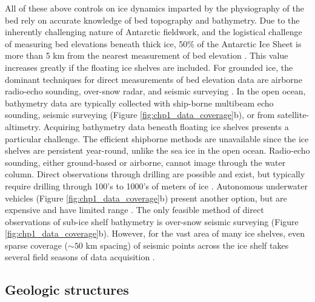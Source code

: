 All of these above controls on ice dynamics imparted by the physiography of the bed rely on accurate knowledge of bed topography and bathymetry. Due to the inherently challenging nature of Antarctic fieldwork, and the logistical challenge of measuring bed elevations beneath thick ice, 50\% of the Antarctic Ice Sheet is more than 5 km from the nearest measurement of bed elevation \citep[Figure \ref{fig:chp1_data_coverage}a,][]{morlighemdeep2020}. This value increases greatly if the floating ice shelves are included. For grounded ice, the dominant techniques for direct measurements of bed elevation data are airborne radio-echo sounding, over-snow radar, and seismic surveying \citep[Figure \ref{fig:chp1_data_coverage}b,][]{fretwellbedmap22013}. In the open ocean, bathymetry data are typically collected with ship-borne multibeam echo sounding, seismic surveying (Figure \ref{fig:chp1_data_coverage}b), or from satellite-altimetry. Acquiring bathymetry data beneath floating ice shelves presents a particular challenge. The efficient shipborne methods are unavailable since the ice shelves are persistent year-round, unlike the sea ice in the open ocean. Radio-echo sounding, either ground-based or airborne, cannot image through the water column. Direct observations through drilling are possible and exist, but typically require drilling through 100's to 1000's of meters of ice \citep[Figure \ref{fig:chp1_data_coverage},][]{cloughross1979, pattersonsensitivity2022}. Autonomous underwater vehicles (Figure \ref{fig:chp1_data_coverage}b) present another option, but are expensive and have limited range \citep{dowdeswellautonomous2008, nichollsmeasurements2006}. The only feasible method of direct observations of sub-ice shelf bathymetry is over-snow seismic surveying (Figure \ref{fig:chp1_data_coverage}b). However, for the vast area of many ice shelves, even sparse coverage ($\sim50$ km spacing) of seismic points across the ice shelf takes several field seasons of data acquisition \citep{bentleyross1984}. 


\subsection{Geologic structures}

